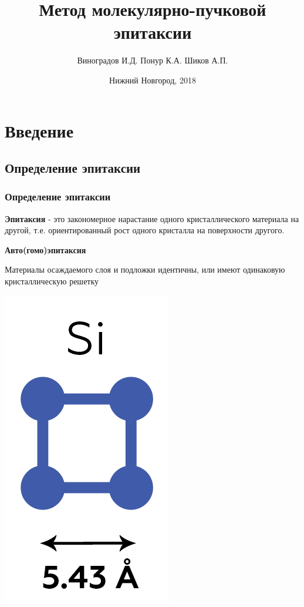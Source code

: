 \documentclass[10pt,pdf,hyperref={unicode}, dvipsnames]{beamer}
\title[Метод молекулярно-пучковой эпитаксии]{Метод молекулярно-пучковой эпитаксии}
\author{%
	Виноградов И.Д. %
	Понур К.А. %
	Шиков А.П. %
}
\institute{Радиофизический факультет ННГУ, 430 группа}
\date{Нижний Новгород, 2018}
\begin{document}
  
\begin{frame}
\titlepage
\end{frame}


\section{Введение}
\subsection{Определение эпитаксии}
\begin{frame}[t]
	\frametitle{Определение эпитаксии}
	\textbf{Эпитаксия} - это закономерное нарастание одного кристаллического материала на другой, т.е. ориентированный
	рост одного кристалла на поверхности другого.
	\vspace{20pt}

	\centering
	\begin{minipage}{0.49\linewidth}
		\centering
		\textbf{Авто(гомо)эпитаксия}

		Материалы осаждаемого слоя и подложки идентичны, или имеют одинаковую кристаллическую решетку
		\centering

		\includegraphics[width=0.6\linewidth]{imgs/SiCell.png}
		

\end{minipage}
\end{frame}
\end{document}

